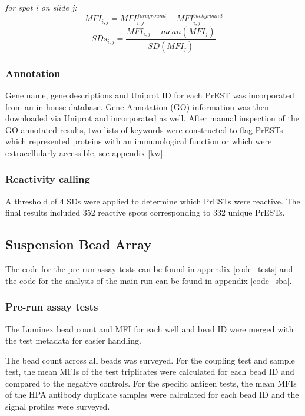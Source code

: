 \documentclass{article}
\begin{document}
\textit{for spot i on slide j:}
\begin{equation}\label{mfi}
    MFI_{i,j} = MFI^{foreground}_{i,j} - MFI^{background}_{i,j}
\end{equation}
\begin{equation}\label{sds}
    SDs_{i,j} = \frac{MFI_{i,j} - mean(MFI_j)}{SD(MFI_j)}
\end{equation}

\subsubsection{Annotation}
Gene name, gene descriptions and Uniprot ID for each PrEST was incorporated from an in-house database. Gene Annotation (GO) \cite{GO} information was then downloaded via Uniprot \cite{uniprot} and incorporated as well. After manual inspection of the GO-annotated results, two lists of keywords were constructed to flag PrESTs which represented proteins with an immunological function or which were extracellularly accessible, see appendix \ref{kw}.

\subsubsection{Reactivity calling}
A threshold of 4 SDs were applied to determine which PrESTs were reactive. The final results included 352 reactive spots corresponding to 332 unique PrESTs.

\subsection{Suspension Bead Array}
The code for the pre-run assay tests can be found in appendix \ref{code_tests} and the code for the analysis of the main run can be found in appendix \ref{code_sba}.

\subsubsection{Pre-run assay tests}
The Luminex bead count and MFI for each well and bead ID were merged with the test metadata for easier handling.

The bead count across all beads was surveyed. For the coupling test and sample test, the mean MFIs of the test triplicates were calculated for each bead ID and compared to the negative controls. For the specific antigen tests, the mean MFIs of the HPA antibody duplicate samples were calculated for each bead ID and the signal profiles were surveyed.
\end{document}
